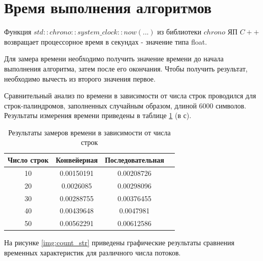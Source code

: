 \section{Время выполнения алгоритмов}

Функция $std::chrono::system\_clock::now(...)$ из библиотеки $chrono$ ЯП $C++$ возвращает  процессорное время в секундах - значение типа float.

Для замера времени необходимо получить значение времени до начала выполнения алгоритма, затем после его окончания. Чтобы получить результат, необходимо вычесть из второго значения первое.

Сравнительный анализ по времени в зависимости от числа строк проводился для строк-палиндромов, заполненных случайным образом, длиной 6000 символов. Результаты измерения времени приведены в таблице \ref{tbl:time_count_str} (в с).

\begin{table}[h]
    \begin{center}
        \begin{threeparttable}
        \captionsetup{justification=raggedright,singlelinecheck=off}
        \caption{Результаты замеров времени в зависимости от числа строк}
        \label{tbl:time_count_str}
        \begin{tabular}{|c|c|c|c|}
            \hline
            Число строк & Конвейерная & Последовательная \\
            \hline
            10 & 0.00150191 & 0.00208726 \\ \hline  
            20 & 0.0026085 & 0.00298096 \\ \hline
            30 & 0.00288755 & 0.00376455 \\ \hline
            40 & 0.00439648 & 0.0047981  \\ \hline 
            50 & 0.00562291 & 0.00612586 \\ \hline
		\end{tabular}
    \end{threeparttable}
\end{center}
\end{table}

На рисунке \ref{img:count_str} приведены графические результаты сравнения временных характеристик для различного числа потоков.

